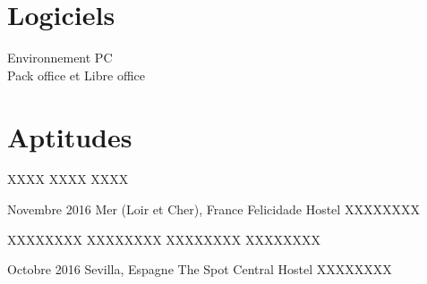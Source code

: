\documentclass[30pt, french]{tccv}
\begin{document}
\begin{upshape}
\begin{competence}
\vspace{0.5cm}
\section{Logiciels}
Environnement PC \\
Pack office et Libre office
 \\

\vspace{0.5cm}
\section{Aptitudes}
\begin{itemize}[leftmargin=13pt]
  \setlength\itemsep{-3pt} 
  \cvitem[\checkmark]  XXXX 
  \cvitem[\checkmark]  XXXX
  \cvitem[\checkmark]  XXXX
\end{itemize}



\end{competence}




%
%


\begin{experience}



\setlength{\parskip}{0pt}
\item{\color{text} Novembre 2016 }
     {Mer (Loir et Cher), France}
     {Felicidade Hostel}
     \fontsize{9pt}{1em}\color{text}\bodyfontlight\upshape\selectfont
%
 XXXXXXXX     \\ 

    \setlength{\parskip}{-10pt}
    \begin{itemize}
      \setlength\itemsep{-3pt} 
      \cvitem[\checkmark] XXXXXXXX    
      \cvitem[\checkmark] XXXXXXXX   
      \cvitem[\checkmark] XXXXXXXX    
      \cvitem[\checkmark] XXXXXXXX    
    \end{itemize}     

    
    
    
\setlength{\parskip}{0pt}        
\item{Octobre 2016}
     {Sevilla, Espagne}
     {The Spot Central Hostel}
     \fontsize{9pt}{1em}\color{text}\bodyfontlight\upshape\selectfont
%
 XXXXXXXX    \\
    

\end{experience}
\end{upshape}
\end{document}
